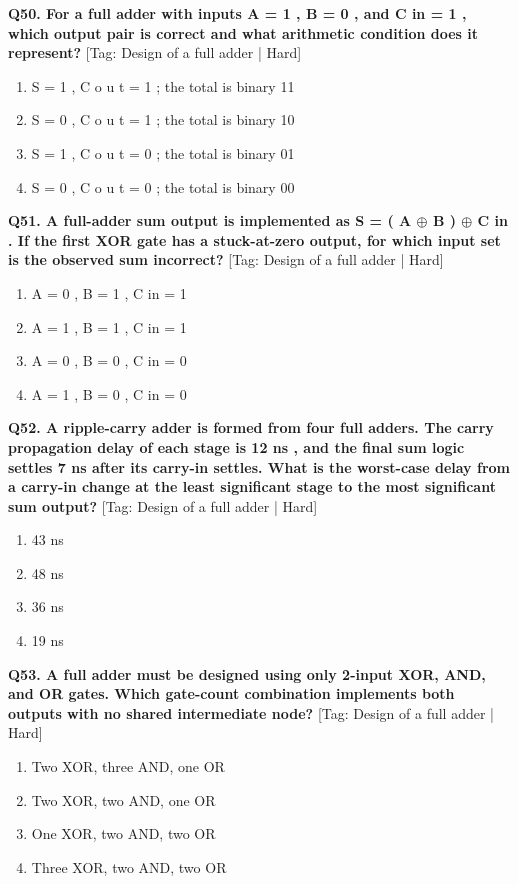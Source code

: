 \noindent\textbf{Q50. For a full adder with inputs A = 1 , B = 0 , and C in = 1 , which output pair is correct and what arithmetic condition does it represent?} \hfill [Tag: Design of a full adder | Hard]
\begin{enumerate}[label=(\alph*),topsep=2pt,itemsep=1pt,partopsep=0pt,parsep=0pt]
    \item {S = 1 , C o u t = 1 ; the total is binary 11}
    \item {S = 0 , C o u t = 1 ; the total is binary 10}
    \item {S = 1 , C o u t = 0 ; the total is binary 01}
    \item {S = 0 , C o u t = 0 ; the total is binary 00}
\end{enumerate}
\vspace{2mm}

\noindent\textbf{Q51. A full-adder sum output is implemented as S = ( A $\oplus$ B ) $\oplus$ C in . If the first XOR gate has a stuck-at-zero output, for which input set is the observed sum incorrect?} \hfill [Tag: Design of a full adder | Hard]
\begin{enumerate}[label=(\alph*),topsep=2pt,itemsep=1pt,partopsep=0pt,parsep=0pt]
    \item {A = 0 , B = 1 , C in = 1}
    \item {A = 1 , B = 1 , C in = 1}
    \item {A = 0 , B = 0 , C in = 0}
    \item {A = 1 , B = 0 , C in = 0}
\end{enumerate}
\vspace{2mm}

\noindent\textbf{Q52. A ripple-carry adder is formed from four full adders. The carry propagation delay of each stage is 12 ns , and the final sum logic settles 7 ns after its carry-in settles. What is the worst-case delay from a carry-in change at the least significant stage to the most significant sum output?} \hfill [Tag: Design of a full adder | Hard]
\begin{enumerate}[label=(\alph*),topsep=2pt,itemsep=1pt,partopsep=0pt,parsep=0pt]
    \item {43 ns}
    \item {48 ns}
    \item {36 ns}
    \item {19 ns}
\end{enumerate}
\vspace{2mm}

\noindent\textbf{Q53. A full adder must be designed using only 2-input XOR, AND, and OR gates. Which gate-count combination implements both outputs with no shared intermediate node?} \hfill [Tag: Design of a full adder | Hard]
\begin{enumerate}[label=(\alph*),topsep=2pt,itemsep=1pt,partopsep=0pt,parsep=0pt]
    \item {Two XOR, three AND, one OR}
    \item {Two XOR, two AND, one OR}
    \item {One XOR, two AND, two OR}
    \item {Three XOR, two AND, two OR}
\end{enumerate}
\vspace{2mm}

